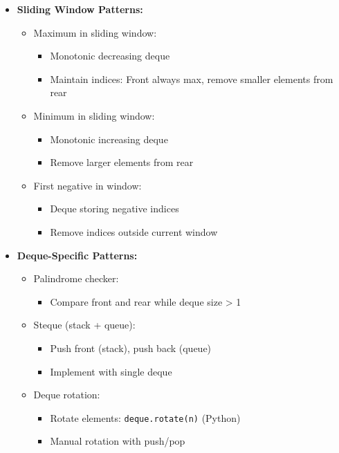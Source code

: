 \documentclass[a4paper,10pt]{book}
\begin{document}
\begin{itemize}
    \item \textbf{Sliding Window Patterns:}
    \begin{itemize}
        \item Maximum in sliding window:
        \begin{itemize}
            \item Monotonic decreasing deque
            \item Maintain indices: Front always max, remove smaller elements from rear
        \end{itemize}
        \item Minimum in sliding window:
        \begin{itemize}
            \item Monotonic increasing deque
            \item Remove larger elements from rear
        \end{itemize}
        \item First negative in window:
        \begin{itemize}
            \item Deque storing negative indices
            \item Remove indices outside current window
        \end{itemize}
    \end{itemize}
    
    \item \textbf{Deque-Specific Patterns:}
    \begin{itemize}
        \item Palindrome checker:
        \begin{itemize}
            \item Compare front and rear while deque size > 1
        \end{itemize}
        \item Steque (stack + queue):
        \begin{itemize}
            \item Push front (stack), push back (queue)
            \item Implement with single deque
        \end{itemize}
        \item Deque rotation:
        \begin{itemize}
            \item Rotate elements: \texttt{deque.rotate(n)} (Python)
            \item Manual rotation with push/pop
        \end{itemize}
    \end{itemize}
    

\end{itemize}
\end{document}
